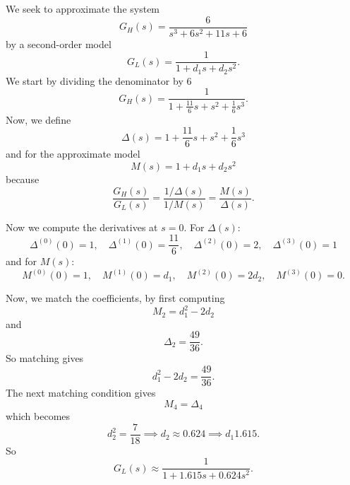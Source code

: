 \begin{exa}
  We seek to approximate the system
  \begin{equation*}
    G_H(s) = \frac{6}{s^3 + 6s^2 + 11s + 6}
  \end{equation*}
  by a second-order model
  \begin{equation*}
    G_L(s) = \frac{1}{1 + d_1 s + d_2 s^2}
  .\end{equation*}
  \tcblower
  We start by dividing the denominator by 6
  \begin{equation*}
    G_H(s) = \frac{1}{1 + \frac{11}{6} s + s^2 + \frac{1}{6}s^3}
  .\end{equation*}
  Now, we define
  \begin{equation*}
    \Delta (s) = 1 + \frac{11}{6}s + s^2 + \frac{1}{6}s^3
  \end{equation*}
  and for the approximate model
  \begin{equation*}
    M(s) = 1 + d_1s + d_2s^2
  \end{equation*}
  because
  \begin{equation*}
    \frac{G_H(s)}{G_L(s)} = \frac{1 / \Delta (s)}{1 / M(s)} = \frac{M(s)}{\Delta (s)}
  .\end{equation*}
  
  Now we compute the derivatives at $s = 0$.
  For $\Delta (s)$:
  \begin{equation*}
    \Delta^{(0)}(0) = 1, \quad \Delta^{(1)}(0) = \frac{11}{6}, \quad \Delta^{(2)}(0) = 2, \quad \Delta^{(3)}(0) = 1
  \end{equation*}
  and for $M(s)$:
  \begin{equation*}
    M^{(0)} (0) = 1, \quad M^{(1)}(0) = d_1, \quad M^{(2) }(0) = 2d_2, \quad M^{(3) }(0) = 0
  .\end{equation*}
  
  Now, we match the coefficients, by first computing
  \begin{equation*}
    M_2 = d_1^2 - 2d_2
  \end{equation*}
  and
  \begin{equation*}
      \Delta_2 = \frac{49}{36}
  .\end{equation*}
  So matching gives
  \begin{equation*}
    d_1^2 - 2d_2 = \frac{49}{36}
  .\end{equation*}
  The next matching condition gives
  \begin{equation*}
    M_4 = \Delta_4
  \end{equation*}
  which becomes
  \begin{equation*}
    d_2^2 = \frac{7}{18} \implies d_2 \approx \num{0,624}  \implies d_1 \num{1,615} 
  .\end{equation*}
  So
  \begin{equation*}
    G_L(s) \approx \frac{1}{1 + \num{1,615} s + \num{0,624} s^2}
  .\end{equation*}
\end{exa}
